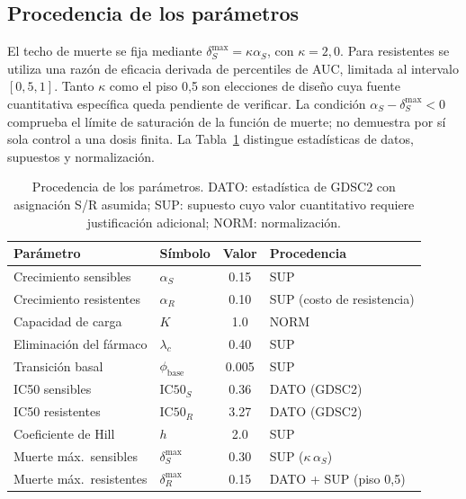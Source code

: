\subsection{Procedencia de los parámetros}

El techo de muerte se fija mediante $\delta_S^{\max}=\kappa\alpha_S$, con $\kappa=2{,}0$. Para resistentes se utiliza una razón de eficacia derivada de percentiles de AUC, limitada al intervalo $[0{,}5,1]$. Tanto $\kappa$ como el piso 0,5 son elecciones de diseño cuya fuente cuantitativa específica queda pendiente de verificar. La condición $\alpha_S-\delta_S^{\max}<0$ comprueba el límite de saturación de la función de muerte; no demuestra por sí sola control a una dosis finita. La Tabla~\ref{tab:procedencia} distingue estadísticas de datos, supuestos y normalización.

\begin{table}[H]
\centering
\caption{Procedencia de los parámetros. DATO: estadística de GDSC2 con asignación S/R asumida; SUP: supuesto cuyo valor cuantitativo requiere justificación adicional; NORM: normalización.}
\label{tab:procedencia}
\renewcommand{\arraystretch}{1.2}
\begin{tabular}{l|l|c|l}
\textbf{Parámetro} & \textbf{Símbolo} & \textbf{Valor} & \textbf{Procedencia} \\
\hline
Crecimiento sensibles      & $\alpha_S$        & 0.15  & SUP \\
Crecimiento resistentes    & $\alpha_R$        & 0.10  & SUP (costo de resistencia) \\
Capacidad de carga         & $K$               & 1.0   & NORM \\
Eliminación del fármaco    & $\lambda_c$       & 0.40  & SUP \\
Transición basal           & $\phi_{\text{base}}$ & 0.005 & SUP \\
IC50 sensibles             & $\mathrm{IC50}_S$ & 0.36  & DATO (GDSC2) \\
IC50 resistentes           & $\mathrm{IC50}_R$ & 3.27  & DATO (GDSC2) \\
Coeficiente de Hill        & $h$               & 2.0   & SUP \\
Muerte máx.\ sensibles     & $\delta_S^{\max}$ & 0.30  & SUP ($\kappa\,\alpha_S$) \\
Muerte máx.\ resistentes   & $\delta_R^{\max}$ & 0.15  & DATO + SUP (piso 0,5) \\
\end{tabular}
\end{table}

